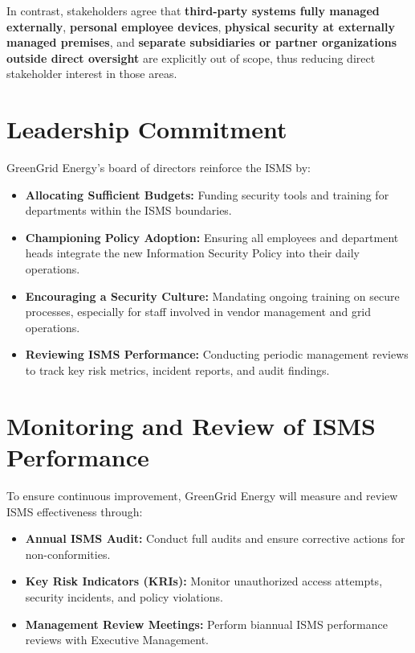 In contrast, stakeholders agree that \textbf{third-party systems fully managed externally},
\textbf{personal employee devices}, \textbf{physical security at externally managed premises},
and \textbf{separate subsidiaries or partner organizations outside direct oversight} are
explicitly out of scope, thus reducing direct stakeholder interest in those areas.

\section{Leadership Commitment}
\label{sec:leadership_commitment}

GreenGrid Energy’s board of directors reinforce
the \ac{ISMS} by:
\begin{itemize}
      \item \textbf{Allocating Sufficient Budgets:} Funding security tools
            and training for departments within the \ac{ISMS} boundaries.
      \item \textbf{Championing Policy Adoption:} Ensuring all employees
            and department heads integrate the new Information Security Policy
            into their daily operations.
      \item \textbf{Encouraging a Security Culture:} Mandating ongoing
            training on secure processes, especially for staff involved in
            vendor management and grid operations.
      \item \textbf{Reviewing \ac{ISMS} Performance:} Conducting periodic
            management reviews to track key risk metrics,
            incident reports, and audit findings.
\end{itemize}

\section{Monitoring and Review of ISMS Performance}
\label{sec:isms_monitoring}

To ensure continuous improvement, GreenGrid Energy will measure and review ISMS effectiveness through:
\begin{itemize}
      \item \textbf{Annual ISMS Audit:} Conduct full audits and ensure corrective actions for non-conformities.
      \item \textbf{Key Risk Indicators (KRIs):} Monitor unauthorized access attempts, security incidents, and policy violations.
      \item \textbf{Management Review Meetings:} Perform biannual ISMS performance reviews with Executive Management.
\end{itemize}


